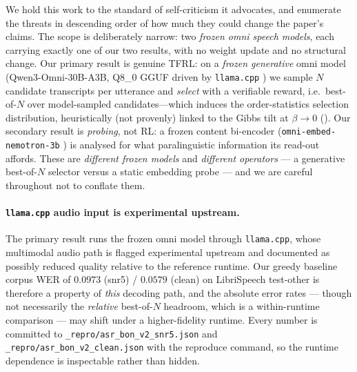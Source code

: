 We hold this work to the standard of self-criticism it advocates, and enumerate the threats in
descending order of how much they could change the paper's claims. The scope is deliberately narrow:
two \emph{frozen omni speech models}, each carrying exactly one of our two results, with no weight
update and no structural change. Our primary result is genuine TFRL: on a \emph{frozen
generative} omni model (Qwen3-Omni-30B-A3B, Q8\_0 GGUF driven by \texttt{llama.cpp}
\citep{qwen3omni}) we sample $N$ candidate transcripts per utterance and \emph{select} with a
verifiable reward, i.e.\ best-of-$N$ over model-sampled candidates---which induces the order-statistics
selection distribution, heuristically (not provenly) linked to the Gibbs tilt at $\beta\to0$
(). Our secondary result is
\emph{probing}, not RL: a frozen content bi-encoder (\texttt{omni-embed-nemotron-3b}
\citep{omniembed2025}) is analysed for what paralinguistic information its read-out affords. These are
\emph{different frozen models} and \emph{different operators} --- a generative best-of-$N$ selector
versus a static embedding probe --- and we are careful throughout not to conflate them.

\paragraph{\texttt{llama.cpp} audio input is experimental upstream.}
The primary result runs the frozen omni model through \texttt{llama.cpp}, whose multimodal audio path
is flagged experimental upstream and documented as possibly reduced quality relative to the reference
runtime. Our greedy baseline corpus WER of $0.0973$ (snr5) / $0.0579$ (clean) on LibriSpeech test-other
is therefore a property of \emph{this} decoding path, and the absolute error rates --- though not
necessarily the \emph{relative} best-of-$N$ headroom, which is a within-runtime comparison --- may shift
under a higher-fidelity runtime. Every number is committed to \texttt{\_repro/asr\_bon\_v2\_snr5.json}
and \texttt{\_repro/asr\_bon\_v2\_clean.json} with the reproduce command, so the runtime dependence is
inspectable rather than hidden.

